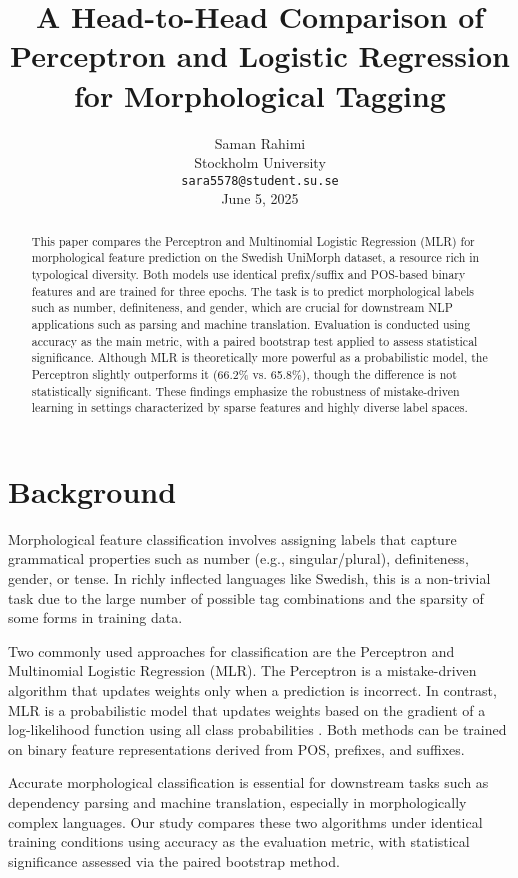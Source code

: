 \documentclass[11pt]{article}
\title{A Head-to-Head Comparison of Perceptron and Logistic Regression for Morphological Tagging}
\author{
  Saman Rahimi \\
  Stockholm University \\
  \texttt{sara5578@student.su.se} \\
  \textnormal{June 5, 2025}
}
\begin{document}
\maketitle

\begin{abstract}
This paper compares the Perceptron and Multinomial Logistic Regression (MLR) for morphological feature prediction on the Swedish UniMorph dataset, a resource rich in typological diversity. Both models use identical prefix/suffix and POS-based binary features and are trained for three epochs. The task is to predict morphological labels such as number, definiteness, and gender, which are crucial for downstream NLP applications such as parsing and machine translation. Evaluation is conducted using accuracy as the main metric, with a paired bootstrap test applied to assess statistical significance. Although MLR is theoretically more powerful as a probabilistic model, the Perceptron slightly outperforms it (66.2\% vs. 65.8\%), though the difference is not statistically significant. These findings emphasize the robustness of mistake-driven learning in settings characterized by sparse features and highly diverse label spaces.
\end{abstract}

\section{Background}
Morphological feature classification involves assigning labels that capture grammatical properties such as number (e.g., singular/plural), definiteness, gender, or tense. In richly inflected languages like Swedish, this is a non-trivial task due to the large number of possible tag combinations and the sparsity of some forms in training data.

Two commonly used approaches for classification are the Perceptron and Multinomial Logistic Regression (MLR). The Perceptron is a mistake-driven algorithm that updates weights only when a prediction is incorrect. In contrast, MLR is a probabilistic model that updates weights based on the gradient of a log-likelihood function using all class probabilities \cite{jurafsky2024slp3}. Both methods can be trained on binary feature representations derived from POS, prefixes, and suffixes.

Accurate morphological classification is essential for downstream tasks such as dependency parsing and machine translation, especially in morphologically complex languages. Our study compares these two algorithms under identical training conditions using accuracy as the evaluation metric, with statistical significance assessed via the paired bootstrap method.
\end{document}
